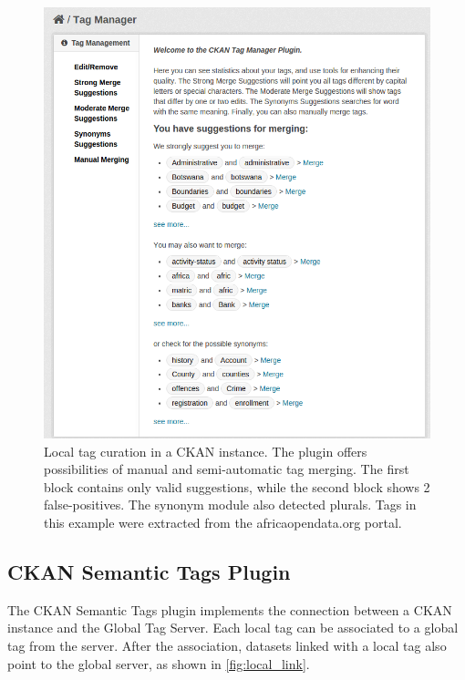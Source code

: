 \begin{figure}[tb]
\begin{center}
\includegraphics[width=\columnwidth]{images/local_curation.png}
\caption[Local tag curation in a CKAN instance.]{Local tag curation in a CKAN instance. The plugin offers possibilities of manual and semi-automatic tag merging. The first block contains only valid suggestions, while the second block shows 2 false-positives. The synonym module also detected plurals. Tags in this example were extracted from the africaopendata.org portal.}
\label{fig:local_curation}
\end{center}
\end{figure}

\subsection{CKAN Semantic Tags Plugin}

The CKAN Semantic Tags plugin implements the connection between a CKAN instance and the Global Tag Server.
Each local tag can be associated to a global tag from the server.
After the association, datasets linked with a local tag also point to the global server, as shown in \autoref{fig:local_link}.

